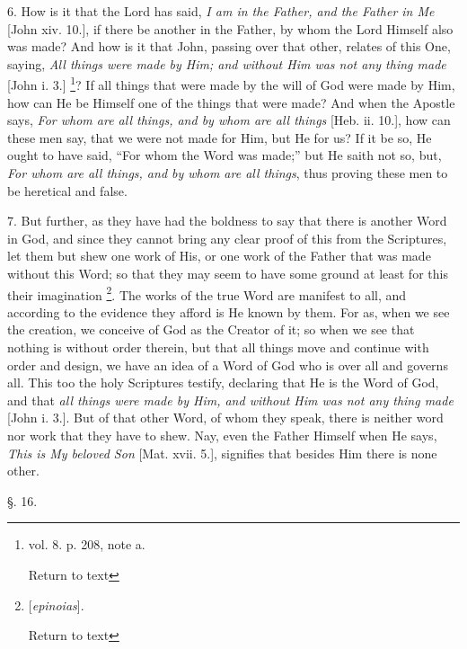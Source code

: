 6. How is it that the Lord has said, \emph{I am in
the Father, and the Father in Me} [John xiv. 10.], if there be
another in the Father, by whom the Lord Himself also was made? And how
is it that John, passing over that other, relates of this One, saying,
\emph{All things were made by Him; and without Him was not any thing made}
[John i. 3.] \footnote{vol. 8. p. 208, note a.

Return to text}? If all things that
were made by the will of God were made by Him, how can He be Himself
one of the things that were made? And when the Apostle says, \emph{For
whom are all things, and by whom are all things} [Heb. ii. 10.],
how can these men say, that we were not made for Him, but He for us?
If it be so, He ought to have said, ``For whom the Word was made;'' but
He saith not so, but, \emph{For whom are all things, and by whom are all
things}, thus proving these men to be heretical and false.

7. But further, as they have had the boldness to
say that there is another Word in God, and since they cannot bring any
clear proof of this from the Scriptures, let them but shew one work of
His, or one work of the Father that was made without this Word; so
that they may seem to have some ground at least for this their
imagination \footnote{[\emph{epinoias}].

Return to text}. The works of the true
Word are manifest to all, and according to the evidence they afford is
He known by them. For as, when we see the creation, we conceive of God
as the Creator of it; so when we see that nothing is without order
therein, but that all things move and continue with order and design,
we have an idea of a Word of God who is over all and governs all. This
too the holy Scriptures testify, declaring that He is the Word of God,
and that \emph{all things were made by Him, and without Him was not any
thing made} [John i. 3.]. But of that other Word, of whom they
speak, there is neither word nor work that they have to shew. Nay,
even the Father Himself when He says, \emph{This is My beloved Son}
[Mat. xvii. 5.], signifies that besides Him there is none other.

§. 16.

